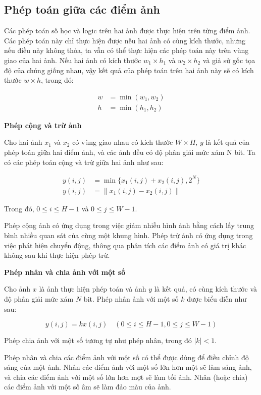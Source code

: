 \subsection{Phép toán giữa các điểm ảnh}

Các phép toán số học và logic trên hai ảnh được thực hiện trên từng điểm ảnh.
Các phép toán này chỉ thực hiện được nếu hai ảnh có cùng kích thước, nhưng nếu điều này không thỏa, ta vẫn có thể thực hiện các phép toán này trên vùng giao của hai ảnh. Nếu hai ảnh có kích thước $w_1 \times h_1$ và $w_2 \times h_2$ và giả sử gốc tọa độ của chúng giống nhau, vậy kết quả của phép toán trên hai ảnh này sẽ có kích thước $w \times h$, trong đó:

\begin{align}
    w &= \min (w_1, w_2) \\
    h &= \min (h_1, h_2)
\end{align}

\textbf{Phép cộng và trừ ảnh}

Cho hai ảnh $x_1$ và $x_2$ có vùng giao nhau có kích thước $W \times H$, $y$ là kết quả của phép toán giữa hai điểm ảnh, và các ảnh đều có độ phân giải mức xám N bit. Ta có các phép toán cộng và trừ giữa hai ảnh như sau:

\begin{align}
    y(i,j) &= \min \{ x_1(i,j) + x_2(i,j), 2^N \} \\
    y(i,j) &= \| x_1(i,j) - x_2(i,j) \|
\end{align}

Trong đó, $0 \leq i \leq H-1$ và $0 \leq j \leq W-1$.

Phép cộng ảnh có ứng dụng trong việc giảm nhiễu hình ảnh bằng cách lấy trung bình nhiều quan sát của cùng một khung hình. 
Phép trừ ảnh có ứng dụng trong việc phát hiện chuyển động, thông qua phân tích các điểm ảnh có giá trị khác không sau khi thực hiện phép trừ.

\textbf{Phép nhân và chia ảnh với một số}

Cho ảnh $x$ là ảnh thực hiện phép toán và ảnh $y$ là kết quả, có cùng kích thước và độ phân giải mức xám $N$ bit.
Phép nhân ảnh với một số $k$ được biểu diễn như sau:

\begin{equation}
    y(i,j) = k x(i,j) \quad (0 \leq i \leq H-1, 0 \leq j \leq W-1)
\end{equation}

Phép chia ảnh với một số tương tự như phép nhân, trong đó $|k| < 1$.

Phép nhân và chia các điểm ảnh với một số có thể được dùng để điều chỉnh độ sáng của một ảnh. Nhân các điểm ảnh với một số lớn hơn một sẽ làm sáng ảnh, và chia các điểm ảnh với một số lớn hơn mợt sẽ làm tối ảnh. Nhân (hoặc chia) các điểm ảnh với một số âm sẽ làm đảo màu của ảnh.

